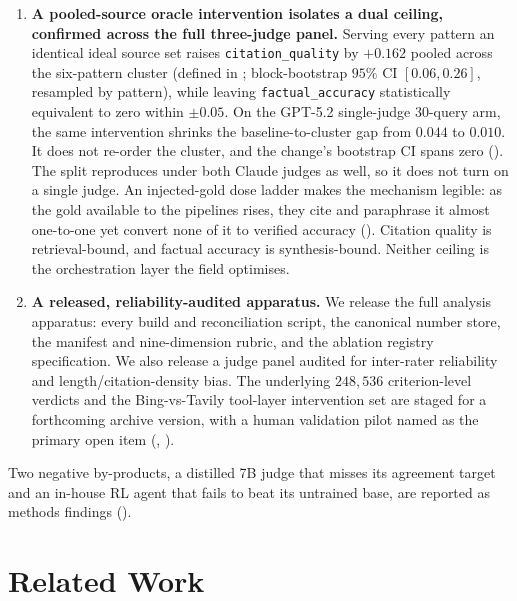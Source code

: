 \documentclass[11pt]{article}
\newcommand{\dimrow}[1]{\texttt{#1}}
\begin{document}
\begin{enumerate}[leftmargin=1.5em,itemsep=2pt,topsep=2pt]
($\beta{=}{-}0.001$). The bonus therefore belongs to a citation-\emph{presence} rubric read by
length-sensitive judges. Two concurrent audits
\citep{refhalluc2026,citednotverified2026} corroborate it on deployed systems.
\item \textbf{A pooled-source oracle intervention isolates a dual ceiling, confirmed across the full
three-judge panel.} Serving every pattern an identical ideal source set raises
\dimrow{citation\_quality} by $+0.162$ pooled across the six-pattern cluster (defined in
; block-bootstrap $95\%$ CI
$[0.06,0.26]$, resampled by pattern), while leaving \dimrow{factual\_accuracy} statistically equivalent to zero
within $\pm0.05$. On the GPT-5.2 single-judge $30$-query arm, the same intervention
shrinks the
baseline-to-cluster gap from $0.044$ to $0.010$. It does not re-order the cluster, and
the change's bootstrap CI spans zero
(). The split reproduces under both
Claude judges as well, so it does not turn on a single judge. An injected-gold dose ladder
makes the mechanism legible: as the gold available to the pipelines rises, they cite and
paraphrase it almost one-to-one yet convert none of it to verified accuracy
(). Citation quality is retrieval-bound, and factual accuracy is
synthesis-bound. Neither ceiling is the orchestration layer the field optimises.
\item \textbf{A released, reliability-audited apparatus.} We release the full analysis
apparatus: every build and reconciliation script, the canonical number store, the manifest and
nine-dimension rubric, and the ablation registry specification. We also release a judge panel
audited for inter-rater reliability and length/citation-density bias. The underlying
$248{,}536$ criterion-level verdicts and the Bing-vs-Tavily tool-layer intervention set are staged
for a forthcoming archive version, with a human
validation pilot named as the primary open item (, ).
\end{enumerate}

\noindent Two negative by-products, a
distilled 7B judge that misses its
agreement target and an in-house RL agent that fails to beat its untrained
base, are reported as methods findings ().
\section{Related Work}\label{sec:related}
\end{document}

